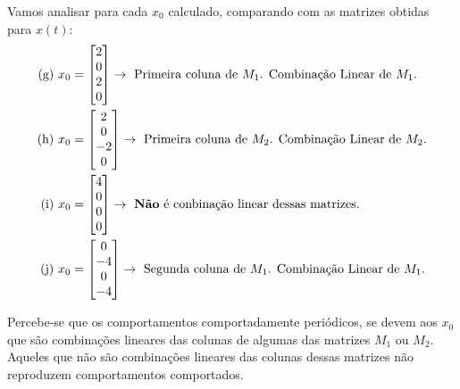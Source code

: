\documentclass[11pt]{article}
\begin{document}
Vamos analisar para cada $x_0$ calculado, comparando com as matrizes obtidas para $x(t)$:
\begin{align*}
\text{(g) } x_0 &=
\begin{bmatrix}
  2\\
  0\\
  2\\
  0
\end{bmatrix} \rightarrow \text{ Primeira coluna de } M_1 \text{. Combinação Linear de } M_1.\\
\text{(h) } x_0 &=
\begin{bmatrix}
  2\\
  0\\
  -2\\
  0
\end{bmatrix} \rightarrow \text{ Primeira coluna de } M_2 \text{. Combinação Linear de } M_2.\\
\text{(i) } x_0 &=
\begin{bmatrix}
  4\\
  0\\
  0\\
  0
\end{bmatrix} \rightarrow \text{ \textbf{Não} é conbinação linear dessas matrizes.}\\
\text{(j) } x_0 &=
\begin{bmatrix}
  0\\
  -4\\
  0\\
  -4
\end{bmatrix} \rightarrow \text{ Segunda coluna de } M_1 \text{. Combinação Linear de } M_1.
\end{align*}

Percebe-se que os comportamentos comportadamente periódicos, se devem aos $x_0$ que são combinações lineares das colunas de algumas das matrizes $M_1$ ou $M_2$. Aqueles que não são combinações lineares das colunas dessas matrizes não reproduzem comportamentos comportados.
\end{document}
